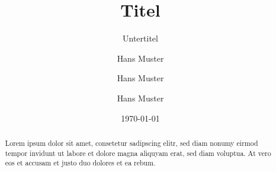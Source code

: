 

\titlehead{BSc Computational and Data Science\\CDSnnn Modulname\\Dozent: Prof. Hans Muster\hfill}
\title{Titel}
\subtitle{Untertitel}
\author[1,*]{Hans Muster}
\author[1]{Hans Muster}
\author[1]{Hans Muster}
\date{\today}
\maketitle

\begin{abstract}
Lorem ipsum dolor sit amet, consetetur sadipscing elitr, sed diam nonumy eirmod tempor invidunt ut labore et dolore magna aliquyam erat, sed diam voluptua. At vero eos et accusam et justo duo dolores et ea rebum.
\end{abstract}
